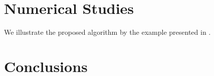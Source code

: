 \documentclass[twocolumn,amsthm]{autart}%
\theoremstyle{definition}
\theoremstyle{plain}
\begin{document}
\section{Numerical Studies}

We illustrate the proposed algorithm by the example presented in \cite{le2024distributed}.

\section{Conclusions}


\begin{comment}
\section{Optimization Algorithm}

We need to develop an optimization algorithm to efficiently solve not in centralized manner.
Two approaches have been found in the literature:

\begin{itemize}
\item Distributed optimization: \cite{huang2023decentralized}.
\item Sequential computation with priority assignment: \cite{katriniok2022fully}, \cite{scheffe2023reducing}.
\end{itemize}

Let assume that the TLC units keep the trajectory prediction of HDVs on each lane.

\section{Prediction Model for HDVs}

\Note{Will start doing simulation with constant acceleration model first.}


\begin{itemize}
\item The human driving behavior may follow different modes (\eg car-following, constant velocity, or constant acceleration), and the human control policy in each mode is parameterized by parameters (\eg car-following model's parameters) that describe different human driving styles.



\end{comment}
\end{document}
